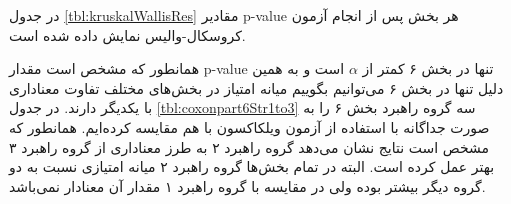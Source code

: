 \documentclass[twoside, a4paper,11pt]{book}
\numberwithin{equation}{chapter}
\numberwithin{table}{chapter}
\numberwithin{figure}{chapter}
\numberwithin{equation}{chapter}
\begin{document}
در جدول \ref{tbl:kruskalWallisRes} مقادیر p-value هر بخش پس از انجام آزمون کروسکال-والیس نمایش داده شده است.

\begin{table}[]
\end{table}

همانطور که مشخص است مقدار p-value تنها در بخش ۶ کمتر از $\alpha$ است و به همین دلیل تنها در بخش ۶ می‌توانیم بگوییم میانه امتیاز در بخش‌های مختلف تفاوت معناداری با یکدیگر دارند. در جدول \ref{tbl:coxonpart6Str1to3} سه گروه راهبرد بخش ۶ را به صورت جداگانه با استفاده از آزمون ویلکاکسون با هم مقایسه کرده‌ایم. همانطور که مشخص است نتایج نشان می‌دهد گروه راهبرد ۲ به طرز معناداری از گروه راهبرد ۳ بهتر عمل کرده است. البته در تمام بخش‌ها گروه راهبرد ۲ میانه امتیازی نسبت به دو گروه دیگر بیشتر بوده ولی در مقایسه با گروه راهبرد ۱ مقدار آن معنادار نمی‌باشد.
\end{document}
